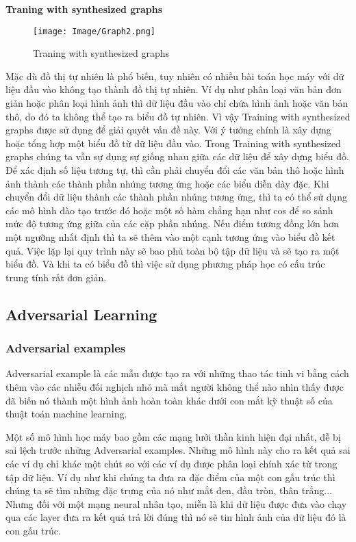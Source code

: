 \textbf{Traning with synthesized graphs}

\begin{figure}[h!]
    \centering
    \texttt{[image: Image/Graph2.png]}
    \caption{Traning with synthesized graphs}
    \label{Hình 1.3: Traning with synthesized graphs}
    \cite*{WEBSITE:4}
\end{figure}

Mặc dù đồ thị tự nhiên là phổ biến, tuy nhiên có nhiều bài toán học máy với dữ liệu đầu vào không tạo thành đồ thị tự nhiên.
Ví dụ như phân loại văn bản đơn giản hoặc phân loại hình ảnh thì dữ liệu đầu vào chỉ chứa hình ảnh hoặc văn bản thô, do đó ta không thể 
tạo ra biểu đồ tự nhiên. Vì vậy Training with synthesized graphs được sử dụng để giải quyết vấn đề này. Với ý tưởng chính là xây dựng hoặc tổng hợp một biểu đồ từ dữ liệu đầu vào.
Trong Training with synthesized graphs chúng ta vẫn sự dụng sự giống nhau giữa các dữ liệu để xây dựng biểu đồ. Để xác định số liệu tương tự, thì cần phải chuyển đổi các văn bản thô hoặc
hình ảnh thành các thành phần nhúng tương ứng hoặc các biểu diễn dày đặc. Khi chuyển đổi dữ liệu thành các thành phần nhúng tương ứng, thì ta có thể sử dụng các mô hình đào tạo trước đó hoặc 
một số hàm chẳng hạn như cos để so sánh mức độ tương ứng giữa của các cặp phần nhúng. Nếu điểm tương đồng lớn hơn một ngưỡng nhất định thì ta sẽ thêm vào một cạnh tương ứng vào biểu đồ kết quả.
Việc lặp lại quy trình này sẽ bao phủ toàn bộ tập dữ liệu và sẽ tạo ra một biểu đồ. Và khi ta có biểu đồ thì việc sử dụng phương pháp học có cấu trúc trung tính rất đơn giản.


\subsection{Adversarial Learning}

\subsubsection*{Adversarial examples}

Adversarial example là các mẫu được tạo ra với những thao tác tinh vi bằng cách thêm vào các nhiễu đối nghịch nhỏ mà mắt người không thể nào nhìn thấy được đã biến nó thành một hình ảnh hoàn toàn khác dưới con mắt kỹ thuật số của thuật 
toán machine learning.

Một số mô hình học máy bao gồm các mạng lưới thần kinh hiện đại nhất, dễ bị sai lệch trước những Adversarial examples. Những mô hình này cho ra kết quả sai các ví dụ chỉ khác một chút so với các ví dụ được phân loại chính xác từ trong tập 
dữ liệu. Ví dụ như khi chúng ta đưa ra đặc điểm của một con gấu trúc thì chúng ta sẽ tìm những đặc trưng của nó như mắt đen, đầu tròn, thân trắng... Nhưng đối với một mạng neural nhân tạo, miễn là khi dữ liệu được đưa vào chạy qua các layer 
đưa ra kết quả trả lời đúng thì nó sẽ tin hình ảnh của dữ liệu đó là con gấu trúc.

